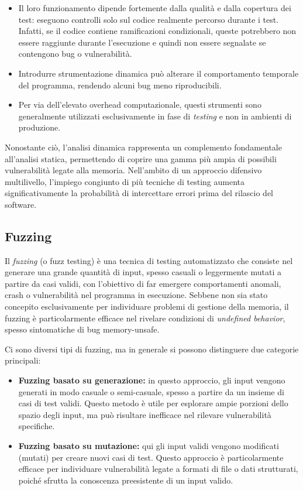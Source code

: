 \begin{itemize}
  \item Il loro funzionamento dipende fortemente dalla qualità e dalla copertura
    dei test: eseguono controlli solo sul codice realmente percorso durante i
    test. Infatti, se il codice contiene ramificazioni condizionali, queste potrebbero
    non essere raggiunte durante l'esecuzione e quindi non essere segnalate se contengono
    bug o vulnerabilità.

  \item Introdurre strumentazione dinamica può alterare il comportamento temporale
    del programma, rendendo alcuni bug meno riproducibili.

  \item Per via dell'elevato overhead computazionale, questi strumenti sono
    generalmente utilizzati esclusivamente in fase di \textit{testing} e non in ambienti
    di produzione.
\end{itemize}

Nonostante ciò, l'analisi dinamica rappresenta un complemento fondamentale all'analisi
statica, permettendo di coprire una gamma più ampia di possibili vulnerabilità legate
alla memoria. Nell'ambito di un approccio difensivo multilivello, l'impiego congiunto
di più tecniche di testing aumenta significativamente la probabilità di intercettare
errori prima del rilascio del software.

\subsection{Fuzzing}
\label{sec:fuzzing}

Il \textit{fuzzing} (o fuzz testing) è una tecnica di testing automatizzato che consiste
nel generare una grande quantità di input, spesso casuali o leggermente mutati a
partire da casi validi, con l'obiettivo di far emergere comportamenti anomali,
crash o vulnerabilità nel programma in esecuzione. Sebbene non sia stato concepito
esclusivamente per individuare problemi di gestione della memoria, il fuzzing è
particolarmente efficace nel rivelare condizioni di \textit{undefined behavior},
spesso sintomatiche di bug memory-unsafe.

\smallskip
Ci sono diversi tipi di fuzzing, ma in generale si possono distinguere due categorie
principali:

\begin{itemize}
  \item \textbf{Fuzzing basato su generazione:} in questo approccio, gli input vengono
    generati in modo casuale o semi-casuale, spesso a partire da un insieme di
    casi di test validi. Questo metodo è utile per esplorare ampie porzioni dello
    spazio degli input, ma può risultare inefficace nel rilevare vulnerabilità
    specifiche.

  \item \textbf{Fuzzing basato su mutazione:} qui gli input validi vengono
    modificati (mutati) per creare nuovi casi di test. Questo approccio è particolarmente
    efficace per individuare vulnerabilità legate a formati di file o dati strutturati,
    poiché sfrutta la conoscenza preesistente di un input valido.
\end{itemize}

